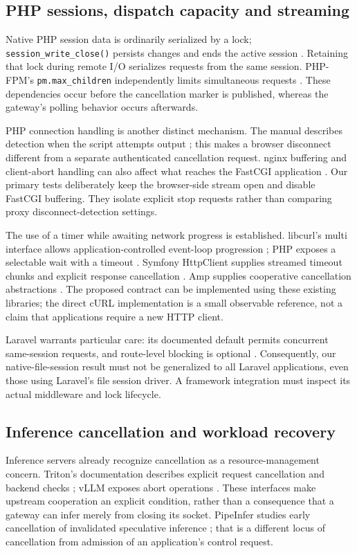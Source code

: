 \documentclass[11pt,a4paper]{article}
\begin{document}
\subsection{PHP sessions, dispatch capacity and streaming}
Native PHP session data is ordinarily serialized by a lock; \texttt{session\_write\_close()} persists changes and ends the active session \cite{phpsession}. Retaining that lock during remote I/O serializes requests from the same session. PHP-FPM's \texttt{pm.max\_children} independently limits simultaneous requests \cite{fpm}. These dependencies occur before the cancellation marker is published, whereas the gateway's polling behavior occurs afterwards.

PHP connection handling is another distinct mechanism. The manual describes detection when the script attempts output \cite{phpconnection}; this makes a browser disconnect different from a separate authenticated cancellation request. nginx buffering and client-abort handling can also affect what reaches the FastCGI application \cite{nginx}. Our primary tests deliberately keep the browser-side stream open and disable FastCGI buffering. They isolate explicit stop requests rather than comparing proxy disconnect-detection settings.

The use of a timer while awaiting network progress is established. libcurl's multi interface allows application-controlled event-loop progression \cite{curlmulti}; PHP exposes a selectable wait with a timeout \cite{phpselect}. Symfony HttpClient supplies streamed timeout chunks and explicit response cancellation \cite{symfony}. Amp supplies cooperative cancellation abstractions \cite{amp}. The proposed contract can be implemented using these existing libraries; the direct cURL implementation is a small observable reference, not a claim that applications require a new HTTP client.

Laravel warrants particular care: its documented default permits concurrent same-session requests, and route-level blocking is optional \cite{laravel}. Consequently, our native-file-session result must not be generalized to all Laravel applications, even those using Laravel's file session driver. A framework integration must inspect its actual middleware and lock lifecycle.

\subsection{Inference cancellation and workload recovery}
Inference servers already recognize cancellation as a resource-management concern. Triton's documentation describes explicit request cancellation and backend checks \cite{triton}; vLLM exposes abort operations \cite{vllm}. These interfaces make upstream cooperation an explicit condition, rather than a consequence that a gateway can infer merely from closing its socket. PipeInfer studies early cancellation of invalidated speculative inference \cite{pipeinfer}; that is a different locus of cancellation from admission of an application's control request.
\end{document}
